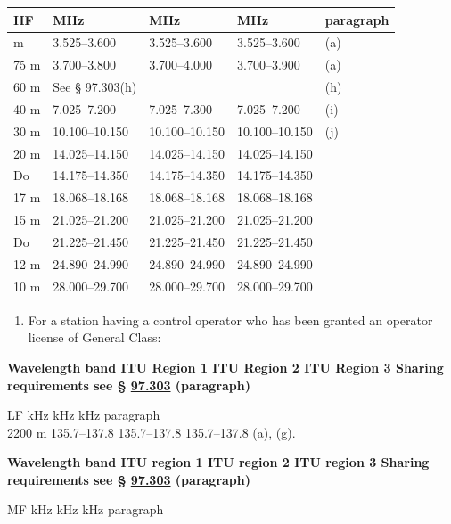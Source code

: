 \documentclass[
  letterpaper,
  DIV=11,
  numbers=noendperiod]{scrreport}
\providecommand{\tightlist}{%
  \setlength{\itemsep}{0pt}\setlength{\parskip}{0pt}}\usepackage{longtable,booktabs,array}
\begin{document}
\begin{longtable}[]{@{}lllll@{}}
\toprule\noalign{}
HF & MHz & MHz & MHz & paragraph \\
\midrule\noalign{}
\endhead
\bottomrule\noalign{}
\endlastfoot
80 m & 3.525--3.600 & 3.525--3.600 & 3.525--3.600 & (a) \\
75 m & 3.700--3.800 & 3.700--4.000 & 3.700--3.900 & (a) \\
60 m & See § 97.303(h) & & & (h) \\
40 m & 7.025--7.200 & 7.025--7.300 & 7.025--7.200 & (i) \\
30 m & 10.100--10.150 & 10.100--10.150 & 10.100--10.150 & (j) \\
20 m & 14.025--14.150 & 14.025--14.150 & 14.025--14.150 & \\
Do & 14.175--14.350 & 14.175--14.350 & 14.175--14.350 & \\
17 m & 18.068--18.168 & 18.068--18.168 & 18.068--18.168 & \\
15 m & 21.025--21.200 & 21.025--21.200 & 21.025--21.200 & \\
Do & 21.225--21.450 & 21.225--21.450 & 21.225--21.450 & \\
12 m & 24.890--24.990 & 24.890--24.990 & 24.890--24.990 & \\
10 m & 28.000--29.700 & 28.000--29.700 & 28.000--29.700 & \\
\end{longtable}

\begin{enumerate}
\def\labelenumi{(\alph{enumi})}
\setcounter{enumi}{3}
\tightlist
\item
  For a station having a control operator who has been granted an
  operator license of General Class:
\end{enumerate}

\textbf{Wavelength band ITU Region 1 ITU Region 2 ITU Region 3 Sharing
requirements see § \protect\hyperlink{97.303}{97.303} (paragraph)}

LF \textbar{} kHz \textbar{} kHz \textbar{} kHz \textbar{} paragraph
\textbar{}\\
2200 m \textbar{} 135.7--137.8 \textbar{} 135.7--137.8 \textbar{}
135.7--137.8 \textbar{} (a), (g). \textbar{}

\textbf{Wavelength band ITU region 1 ITU region 2 ITU region 3 Sharing
requirements see § \protect\hyperlink{97.303}{97.303} (paragraph)}

MF \textbar{} kHz \textbar{} kHz \textbar{} kHz \textbar{} paragraph
\textbar{}
\end{document}
